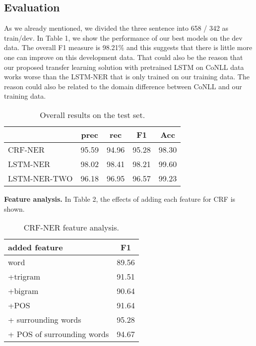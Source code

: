 \documentclass[11pt]{article}
\begin{document}
\subsection{Evaluation}
As we already mentioned, we divided
the three sentence into 658 / 342 as train/dev.
In Table 1, we show the performance of our best models on the dev data.
The overall F1 measure is 98.21\% and this suggests that
there is  little more one can improve on this development data.
That could also be the reason that our proposed transfer learning 
solution with pretrained LSTM on CoNLL data 
works worse than the LSTM-NER that is only trained on our 
training data.
The reason could also be related to the domain difference between
CoNLL and our training data.


\begin{table}[ht]
\begin{center}
\begin{tabular}{l|c|c|c|c}
\hline 
& prec & rec & F1 & Acc\\ 
\hline 
CRF-NER  & 95.59 & 94.96 & 95.28 & 98.30\\ 

\hline 
LSTM-NER          & 98.02 & 98.41 & 98.21 & 99.60\\ 
\hline
LSTM-NER-TWO      & 96.18 & 96.95 & 96.57 & 99.23 \\

 
\end{tabular} 
\caption{Overall results on the test set. }
\end{center}
\label{perf}
\end{table}

\textbf{Feature analysis.}
In Table 2, the effects of adding each feature for CRF
is shown. 

\begin{table}
\begin{center}
\begin{tabular}{l|c}
\hline 
added feature & F1 \\ 
\hline 
word     & 89.56 \\
+trigram & 91.51 \\
+bigram  & 90.64 \\
+POS     & 91.64 \\
+ surrounding words & 95.28 \\
+ POS of surrounding words & 94.67
\end{tabular} 
\caption{CRF-NER feature analysis.}
\end{center}
\label{perf}
\end{table}
\end{document}
